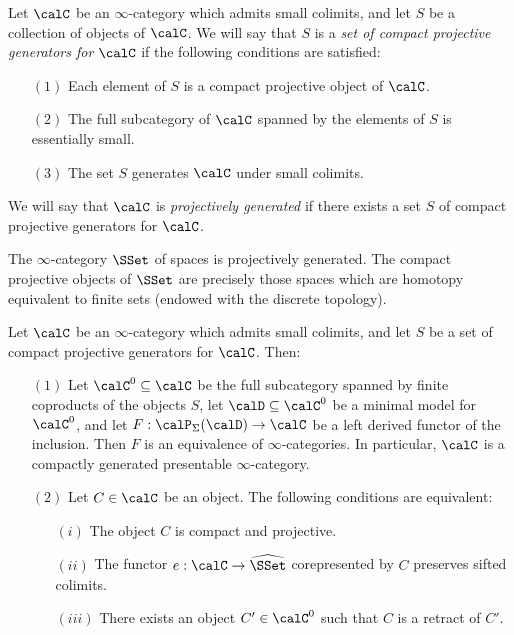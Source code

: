 \begin{definition}\label{defpro}
Let $\calC$ be an $\infty$-category which admits small colimits, and let $S$ be a collection of objects of $\calC$. We will say that $S$ is a {\it set of compact projective generators for $\calC$} if the following conditions are satisfied:
\begin{itemize}
\item[$(1)$] Each element of $S$ is a compact projective object of $\calC$.
\item[$(2)$] The full subcategory of $\calC$ spanned by the elements of $S$ is essentially small.
\item[$(3)$] The set $S$ generates $\calC$ under small colimits.
\end{itemize}
We will say that $\calC$ is {\it projectively generated} if there exists a set $S$ of compact projective generators for $\calC$. 
\end{definition}

\begin{example}\label{swine}
The $\infty$-category $\SSet$ of spaces is projectively generated. The compact projective objects of $\SSet$ are precisely those spaces which are homotopy equivalent to finite sets (endowed with the discrete topology).
\end{example}

\begin{proposition}\label{protus}
Let $\calC$ be an $\infty$-category which admits small colimits, and let $S$ be a set of compact projective generators for $\calC$. Then:
\begin{itemize}
\item[$(1)$] Let $\calC^{0} \subseteq \calC$ be the full subcategory spanned by finite coproducts of the objects $S$, let $\calD \subseteq \calC^{0}$ be a minimal model for $\calC^{0}$, and let
$F: \calP_{\Sigma}( \calD ) \rightarrow \calC$ be a left derived functor of the inclusion. Then $F$ is an equivalence of $\infty$-categories. In particular, $\calC$ is a compactly generated presentable $\infty$-category.
\item[$(2)$] Let $C \in \calC$ be an object. The following conditions are equivalent:
\begin{itemize}
\item[$(i)$] The object $C$ is compact and projective.
\item[$(ii)$] The functor $e: \calC \rightarrow \widehat{\SSet}$ corepresented by $C$
preserves sifted colimits.
\item[$(iii)$] There exists an object $C' \in \calC^{0}$ such that $C$ is a retract of $C'$.
\end{itemize}
\end{itemize}
\end{proposition}

